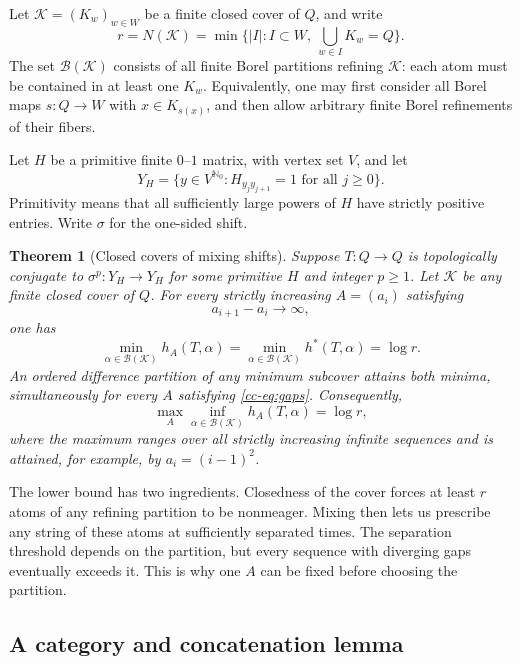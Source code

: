 \documentclass[11pt,reqno]{amsart}
\numberwithin{equation}{section}
\newtheorem{theorem}{Theorem}[section]
\theoremstyle{definition}
\theoremstyle{definition}
\newcommand{\Nzero}{\mathbb N_0}
\newcommand{\hpat}{h^{*}}
\newcommand{\K}{\mathcal K}
\begin{document}
Let $\K=(K_w)_{w\in W}$ be a finite closed cover of $Q$, and write
\[
 r=N(\K)=\min\{|I|:I\subset W,\ \bigcup_{w\in I}K_w=Q\}.
\]
The set $\mathcal B(\K)$ consists of all finite Borel partitions refining
$\K$: each atom must be contained in at least one $K_w$. Equivalently,
one may first consider all Borel maps $s:Q\to W$ with $x\in K_{s(x)}$,
and then allow arbitrary finite Borel refinements of their fibers.

Let $H$ be a primitive finite $0$--$1$ matrix, with vertex set $V$, and
let
\[
 Y_H=\{y\in V^{\Nzero}:H_{y_jy_{j+1}}=1\text{ for all }j\ge0\}.
\]
Primitivity means that all sufficiently large powers of $H$ have strictly
positive entries. Write $\sigma$ for the one-sided shift.

\begin{theorem}[Closed covers of mixing shifts]\label{cc-thm:cover}
Suppose $T:Q\to Q$ is topologically conjugate to $\sigma^p:Y_H\to Y_H$
for some primitive $H$ and integer $p\ge1$. Let $\K$ be any finite closed
cover of $Q$. For every strictly increasing $A=(a_i)$ satisfying
\begin{equation}\label{cc-eq:gaps}
 a_{i+1}-a_i\longrightarrow\infty,
\end{equation}
one has
\begin{equation}\label{cc-eq:coverformula}
 \min_{\alpha\in\mathcal B(\K)} h_A(T,\alpha)
 =\min_{\alpha\in\mathcal B(\K)}\hpat(T,\alpha)
 =\log r.
\end{equation}
An ordered difference partition of any minimum subcover attains both
minima, simultaneously for every $A$ satisfying \eqref{cc-eq:gaps}.
Consequently,
\begin{equation}\label{cc-eq:coverminimax}
 \max_A\inf_{\alpha\in\mathcal B(\K)}h_A(T,\alpha)=\log r,
\end{equation}
where the maximum ranges over all strictly increasing infinite sequences
and is attained, for example, by $a_i=(i-1)^2$.
\end{theorem}

The lower bound has two ingredients. Closedness of the cover forces
at least $r$ atoms of any refining partition to be nonmeager. Mixing
then lets us prescribe any string of these atoms at sufficiently
separated times. The separation threshold depends on the partition,
but every sequence with diverging gaps eventually exceeds it. This is
why one $A$ can be fixed before choosing the partition.

\subsection{A category and concatenation lemma}
\end{document}
